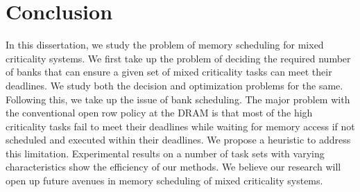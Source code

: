 \chapter{Conclusion}
In this dissertation, we study the problem of memory scheduling for mixed criticality systems. We first take up the problem of deciding the required number of banks that can ensure a given set of mixed criticality tasks can meet their deadlines. We study both the decision and optimization problems for the same. Following this, we take up the issue of bank scheduling. 
The major problem with the conventional open row policy at the DRAM is that most of the high criticality tasks fail to meet their 
deadlines while waiting for memory access if not scheduled and executed within their deadlines. We propose a heuristic to address this limitation. Experimental results 
on a number of task sets with varying characteristics show the efficiency of our methods. We believe our research will open up future avenues in memory scheduling of mixed criticality systems. 